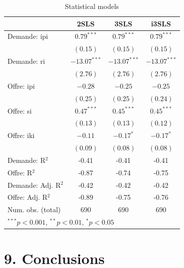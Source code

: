 \documentclass[11pt,]{article}
\begin{document}
\begin{table}[!htbp]
\begin{center}
\begin{tabular}{l c c c }
\hline
 & 2SLS & 3SLS & i3SLS \\
\hline
Demande: ipi        & $0.79^{***}$   & $0.79^{***}$   & $0.79^{***}$   \\
                    & $(0.15)$       & $(0.15)$       & $(0.15)$       \\
Demande: ri         & $-13.07^{***}$ & $-13.07^{***}$ & $-13.07^{***}$ \\
                    & $(2.76)$       & $(2.76)$       & $(2.76)$       \\
Offre: ipi          & $-0.28$        & $-0.25$        & $-0.25$        \\
                    & $(0.25)$       & $(0.25)$       & $(0.24)$       \\
Offre: si           & $0.47^{***}$   & $0.45^{***}$   & $0.45^{***}$   \\
                    & $(0.13)$       & $(0.13)$       & $(0.12)$       \\
Offre: iki          & $-0.11$        & $-0.17^{*}$    & $-0.17^{*}$    \\
                    & $(0.09)$       & $(0.08)$       & $(0.08)$       \\
\hline
Demande: R$^2$      & -0.41          & -0.41          & -0.41          \\
Offre: R$^2$        & -0.87          & -0.74          & -0.75          \\
Demande: Adj. R$^2$ & -0.42          & -0.42          & -0.42          \\
Offre: Adj. R$^2$   & -0.89          & -0.75          & -0.76          \\
Num. obs. (total)   & 690            & 690            & 690            \\
\hline
\multicolumn{4}{l}{\scriptsize{$^{***}p<0.001$, $^{**}p<0.01$, $^*p<0.05$}}
\end{tabular}
\caption{Statistical models}
\label{table : 2sls, 3sls and fiml clusters}
\end{center}
\end{table}

\FloatBarrier

\hypertarget{conclusions}{%
\section{9. Conclusions}\label{conclusions}}
\end{document}
